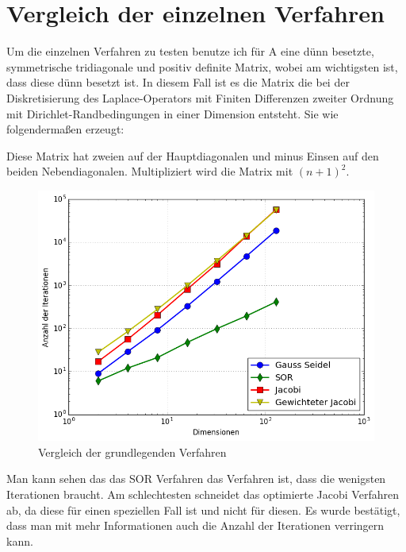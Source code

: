 \documentclass[a4paper, 11pt]{article}
\begin{document}
\newpage

\section{Vergleich der einzelnen Verfahren}
Um die einzelnen Verfahren zu testen benutze ich f\"ur A eine d\"unn besetzte, symmetrische tridiagonale und positiv definite Matrix, wobei am wichtigsten ist, 
dass diese d\"unn besetzt ist. In diesem Fall ist es die Matrix die bei der Diskretisierung des Laplace-Operators mit Finiten Differenzen zweiter Ordnung mit Dirichlet-Randbedingungen in einer Dimension entsteht. 
Sie wie folgenderma\ss{}en erzeugt:
\newline
{}

Diese Matrix hat zweien auf der Hauptdiagonalen und minus Einsen auf den beiden Nebendiagonalen. Multipliziert wird die Matrix mit \((n+1)^{2}\).
\begin{figure}[h]
	\centering
	\includegraphics[width=1\textwidth]{iterationen.png}
	\caption{Vergleich der grundlegenden Verfahren}
	\label{img:Bild1}
\end{figure}
Man kann sehen das das SOR Verfahren das Verfahren ist, dass die wenigsten Iterationen braucht. Am schlechtesten schneidet das optimierte Jacobi Verfahren ab, da diese f\"ur einen speziellen Fall ist und nicht f\"ur diesen.
Es wurde best\"atigt, dass man mit mehr Informationen auch die Anzahl der Iterationen verringern kann.
\end{document}
